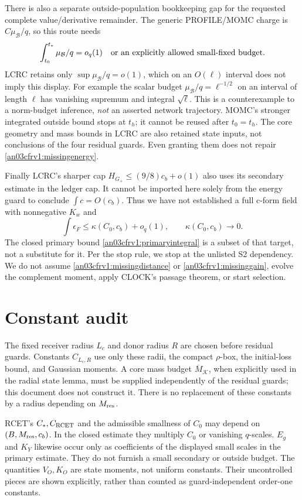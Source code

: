 \documentclass[11pt]{article}
\theoremstyle{remark}\newtheorem{remark}[proposition]{Remark}
\newcommand{\Gp}{G_+}
\newcommand{\KK}{\mathcal K}
\newcommand{\BB}{\mathcal B}
\begin{document}
There is also a separate outside-population bookkeeping gap
for the requested complete value/derivative remainder.
The generic PROFILE/MOMC charge is $C\mu_{\BB}/q$, so this
route needs
\begin{equation}
 \int_{t_0}^{t_*}\mu_{\BB}/q=o_q(1)
 \quad\hbox{or an explicitly allowed small-fixed budget}.
 \label{an03cfrv1:missingoutside}
\end{equation}
LCRC retains only $\sup\mu_{\BB}/q=o(1)$, which on an
$O(\ell)$ interval does not imply this display.
For example the scalar budget $\mu_{\BB}/q=\ell^{-1/2}$
on an interval of length $\ell$ has vanishing supremum
and integral $\sqrt\ell$.
This is a counterexample to a norm-budget inference,
\emph{not} an asserted network trajectory.
MOMC's stronger integrated outside bound stops at $t_h$;
it cannot be reused after $t_0=t_h$.
The core geometry and mass bounds in LCRC are also retained
state inputs, not conclusions of the four residual guards.
Even granting them does not repair
\eqref{an03cfrv1:missingenergy}.

Finally LCRC's sharper cap $H_{\Gp}\le(9/8)c_b+o(1)$ also
uses its secondary estimate in the ledger cap. It cannot
be imported here solely from the energy guard to conclude
$\int c=O(c_b)$.
Thus we have not established a full c-form field with
nonnegative $K_w$ and
\[
 \int\epsilon_F\le\kappa(C_0,c_b)+o_q(1),\qquad
 \kappa(C_0,c_b)\longrightarrow0 .
\]
The closed primary bound \eqref{an03cfrv1:primaryintegral}
is a subset of that target, not a substitute for it.
Per the stop rule, we stop at the unlisted S2 dependency.
We do not assume \eqref{an03cfrv1:missingdistance} or
\eqref{an03cfrv1:missinggain}, evolve the complement moment,
apply CLOCK's passage theorem, or start selection.

\section{Constant audit}
The fixed receiver radius $L_c$ and donor radius $R$ are
chosen before residual guards.
Constants $C_{L_c,R}$ use only these radii, the compact
$\rho$-box, the initial-loss bound, and Gaussian moments.
A core mass budget $\overline M_{\KK}$, when explicitly
used in the radial state lemma, must be supplied independently
of the residual guards; this document does not construct it.
There is no replacement of these constants by a radius
depending on $M_{\rm res}$.

RCET's $C_*,C_{\rm RCET}$ and the admissible smallness of
$C_0$ may depend on $(B,M_{\rm res},c_b)$.
In the closed estimate they multiply $C_0$ or vanishing
$q$-scales. $E_g$ and $K_Y$ likewise occur only as coefficients
of the displayed small scales in the primary estimate.
They do not furnish a small secondary or outside budget.
The quantities $V_O,K_O$ are state moments, not uniform
constants. Their uncontrolled pieces are shown explicitly,
rather than counted as guard-independent order-one constants.
\end{document}
